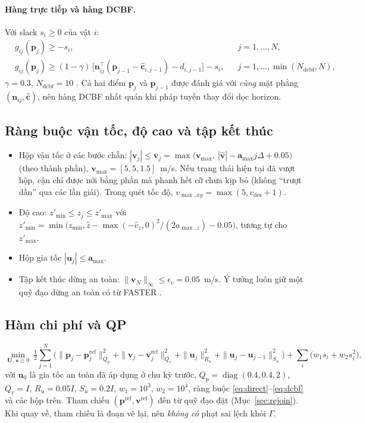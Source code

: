 \documentclass[11pt,a4paper]{article}
\numberwithin{equation}{section}
\newcommand{\vb}[1]{\bm{#1}}
\newcommand{\T}{^{\!\top}}
\newcommand{\diag}{\operatorname{diag}}
\theoremstyle{definition}
\theoremstyle{plain}
\theoremstyle{remark}
\begin{document}
\paragraph{Hàng trực tiếp và hàng DCBF.} Với slack $s_i\ge0$ của vật $i$:
\begin{align}
&g_{ij}(\vb p_j)\ge-s_i, && j=1,\dots,N, \label{eq:direct}\\
&g_{ij}(\vb p_j)\ge(1-\gamma)\,\big[\vb n_{ij}\T(\vb p_{j-1}-\hat{\vb c}_{i,j-1})-d_{i,j-1}\big]-s_i, && j=1,\dots,\min(N_{\text{dcbf}},N), \label{eq:dcbf}
\end{align}
$\gamma=0.3$, $N_{\text{dcbf}}=10$ \cite{zeng2021,jian2022dcbf}. Cả hai điểm $\vb p_j$ và $\vb p_{j-1}$ được đánh giá với \emph{cùng} mặt phẳng $(\vb n_{ij},\hat{\vb c})$, nên hàng DCBF nhất quán khi pháp tuyến thay đổi dọc horizon.

\subsection{Ràng buộc vận tốc, độ cao và tập kết thúc}
\begin{itemize}
\item Hộp vận tốc ở các bước chẵn: $|\vb v_j|\le\bar{\vb v}_j=\max\big(\vb v_{\max},\ |\hat{\vb v}|-\vb a_{\max}j\Delta+0.05\big)$ (theo thành phần), $\vb v_{\max}=[5,5,1.5]$~m/s. Nếu trạng thái hiện tại đã vượt hộp, cận chỉ được nới bằng phần mà phanh hết cỡ chưa kịp bỏ (không ``trượt dần'' qua các lần giải). Trong quét tốc độ, $v_{\max,xy}=\max(5,v_{\text{des}}+1)$.
\item Độ cao: $z'_{\min}\le z_j\le z'_{\max}$ với $z'_{\min}=\min\big(z_{\min},\hat z-\max(-\hat v_z,0)^2/(2a_{\max,z})-0.05\big)$, tương tự cho $z'_{\max}$.
\item Hộp gia tốc $|\vb u_j|\le\vb a_{\max}$.
\item Tập kết thúc dừng an toàn: $\|\vb v_N\|_\infty\le\epsilon_v=0.05$~m/s. Ý tưởng luôn giữ một quỹ đạo dừng an toàn có từ FASTER \cite{tordesillas2021faster}.
\end{itemize}

\subsection{Hàm chi phí và QP}
\begin{equation}
\min_{\mathbf U,\,\vb s\ge0}\ \tfrac12\sum_{j=1}^{N}\Big(\|\vb p_j-\vb p_j^{\text{ref}}\|_{Q_p}^2+\|\vb v_j-\vb v_j^{\text{ref}}\|_{Q_v}^2+\|\vb u_j\|_{R_u}^2+\|\vb u_j-\vb u_{j-1}\|_{S_u}^2\Big)+\sum_{i}\big(w_1s_i+w_2s_i^2\big), \label{eq:mpc}
\end{equation}
với $\vb u_0$ là gia tốc an toàn đã áp dụng ở chu kỳ trước, $Q_p=\diag(0.4,0.4,2)$, $Q_v=I$, $R_u=0.05I$, $S_u=0.2I$, $w_1=10^3$, $w_2=10^4$, ràng buộc \eqref{eq:direct}--\eqref{eq:dcbf} và các hộp trên. Tham chiếu $(\vb p^{\text{ref}},\vb v^{\text{ref}})$ đến từ quỹ đạo đặt (Mục~\ref{sec:rejoin}). Khi quay về, tham chiếu là đoạn vẽ lại, nên \emph{không có} phạt sai lệch khỏi $\Gamma$.
\end{document}
